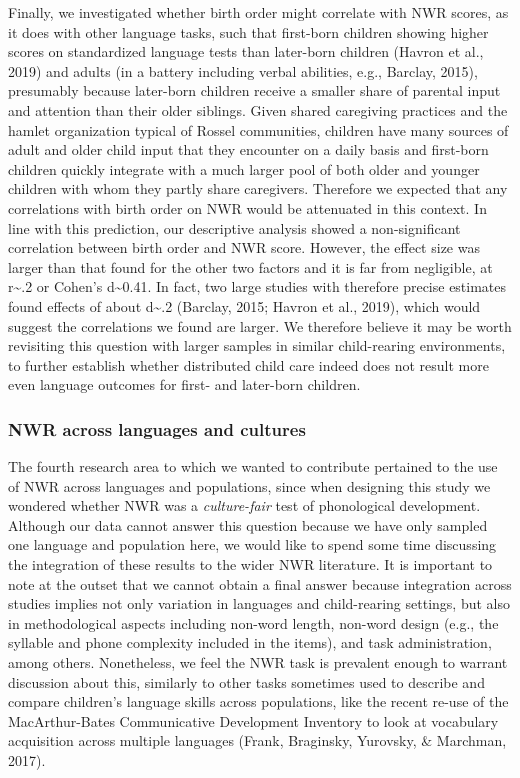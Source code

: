 \documentclass[
  american,
  ,man,floatsintext]{apa6}
\begin{document}
Finally, we investigated whether birth order might correlate with NWR scores, as it does with other language tasks, such that first-born children showing higher scores on standardized language tests than later-born children (Havron et al., 2019) and adults (in a battery including verbal abilities, e.g., Barclay, 2015), presumably because later-born children receive a smaller share of parental input and attention than their older siblings. Given shared caregiving practices and the hamlet organization typical of Rossel communities, children have many sources of adult and older child input that they encounter on a daily basis and first-born children quickly integrate with a much larger pool of both older and younger children with whom they partly share caregivers. Therefore we expected that any correlations with birth order on NWR would be attenuated in this context. In line with this prediction, our descriptive analysis showed a non-significant correlation between birth order and NWR score. However, the effect size was larger than that found for the other two factors and it is far from negligible, at r\textasciitilde.2 or Cohen's d\textasciitilde0.41. In fact, two large studies with therefore precise estimates found effects of about d\textasciitilde.2 (Barclay, 2015; Havron et al., 2019), which would suggest the correlations we found are larger. We therefore believe it may be worth revisiting this question with larger samples in similar child-rearing environments, to further establish whether distributed child care indeed does not result more even language outcomes for first- and later-born children.

\hypertarget{nwr-across-languages-and-cultures}{%
\subsubsection{NWR across languages and cultures}\label{nwr-across-languages-and-cultures}}

The fourth research area to which we wanted to contribute pertained to the use of NWR across languages and populations, since when designing this study we wondered whether NWR was a \emph{culture-fair} test of phonological development. Although our data cannot answer this question because we have only sampled one language and population here, we would like to spend some time discussing the integration of these results to the wider NWR literature. It is important to note at the outset that we cannot obtain a final answer because integration across studies implies not only variation in languages and child-rearing settings, but also in methodological aspects including non-word length, non-word design (e.g., the syllable and phone complexity included in the items), and task administration, among others. Nonetheless, we feel the NWR task is prevalent enough to warrant discussion about this, similarly to other tasks sometimes used to describe and compare children's language skills across populations, like the recent re-use of the MacArthur-Bates Communicative Development Inventory to look at vocabulary acquisition across multiple languages (Frank, Braginsky, Yurovsky, \& Marchman, 2017).
\end{document}
